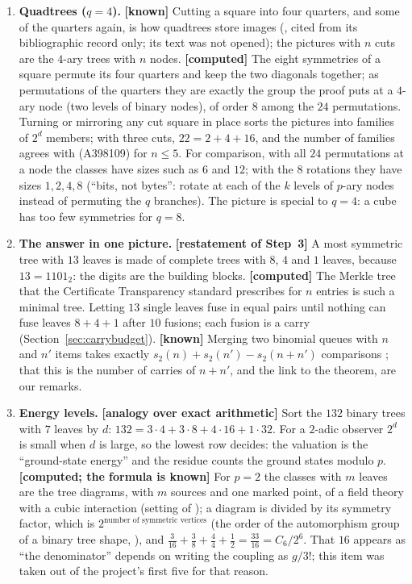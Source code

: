 \documentclass[11pt]{article}
\theoremstyle{definition}
\theoremstyle{remark}
\numberwithin{equation}{section}
\numberwithin{figure}{section}
\begin{document}
\begin{enumerate}[leftmargin=1.6em,itemsep=3pt]
\item \textbf{Quadtrees ($q=4$).} \textbf{[known]} Cutting a square into four quarters, and some of the
quarters again, is how quadtrees store images (\cite{Samet}, cited from its bibliographic record only; its
text was not opened); the pictures with $n$ cuts are the $4$-ary trees
with $n$ nodes. \textbf{[computed]} The eight symmetries of a square permute its four quarters and keep the
two diagonals together; as permutations of the quarters they are exactly the group the proof puts at a
$4$-ary node (two levels of binary nodes), of order $8$ among the $24$ permutations. Turning or mirroring any
cut square in place sorts the pictures into families of $2^d$ members; with three cuts, $22=2+4+16$, and the
number of families agrees with \cite{OEISmobiles} (A398109) for $n\le5$. For comparison, with all $24$
permutations at a node the classes have sizes such as $6$ and $12$; with the $8$ rotations they have sizes
$1,2,4,8$ (``bits, not bytes'': rotate at each of the $k$ levels of $p$-ary nodes instead of permuting the
$q$ branches). The picture is special to $q=4$: a cube has too few symmetries for $q=8$.

\item \textbf{The answer in one picture.} \textbf{[restatement of Step~3]} A most symmetric tree with $13$
leaves is made of complete trees with $8$, $4$ and $1$ leaves, because $13=1101_2$: the digits are the
building blocks. \textbf{[computed]} The Merkle tree that the Certificate Transparency standard prescribes
for $n$ entries \cite{RFC6962} is such a minimal tree. Letting $13$ single leaves fuse in equal pairs until
nothing can fuse leaves $8+4+1$ after $10$ fusions; each fusion is a carry (Section~\ref{sec:carrybudget}).
\textbf{[known]} Merging two binomial queues with $n$ and $n'$ items takes exactly
$s_2(n)+s_2(n')-s_2(n+n')$ comparisons \cite{Vuillemin}; that this is the number of carries of $n+n'$, and the
link to the theorem, are our remarks.

\item \textbf{Energy levels.} \textbf{[analogy over exact arithmetic]} Sort the $132$ binary trees with $7$
leaves by $d$: $132=3\cdot4+3\cdot8+4\cdot16+1\cdot32$. For a $2$-adic observer $2^d$ is small when $d$ is
large, so the lowest row decides: the valuation is the ``ground-state energy'' and the residue counts the
ground states modulo $p$. \textbf{[computed; the formula is known]} For $p=2$ the classes with $m$ leaves are
the tree diagrams, with $m$ sources and one marked point, of a field theory with a cubic interaction (setting
of \cite{Argyres}); a diagram is divided by its symmetry factor, which is $2^{\text{number of symmetric
vertices}}$ (the order of the automorphism group of a binary tree shape, \cite{BonaFlajolet}), and
$\tfrac3{16}+\tfrac38+\tfrac44+\tfrac12=\tfrac{33}{16}=C_6/2^6$. That $16$ appears as ``the denominator''
depends on writing the coupling as $g/3!$; this item was taken out of the project's first five for that
reason.


\end{enumerate}
\end{document}

